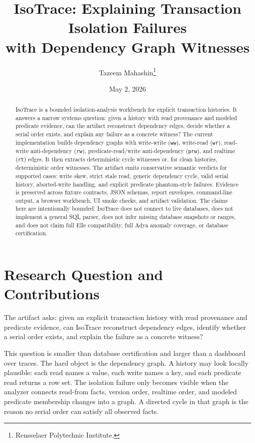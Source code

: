 \documentclass[10pt]{article}
\title{\textbf{IsoTrace: Explaining Transaction Isolation Failures\\with Dependency Graph Witnesses}}
\author{Tazeem Mahashin\footnote{Rensselaer Polytechnic Institute.}}
\date{May 2, 2026}
\newcommand{\code}[1]{\texttt{#1}}
\begin{document}
\maketitle

\begin{abstract}
IsoTrace is a bounded isolation-analysis workbench for explicit transaction histories. It answers a narrow systems question: given a history with read provenance and modeled predicate evidence, can the artifact reconstruct dependency edges, decide whether a serial order exists, and explain any failure as a concrete witness? The current implementation builds dependency graphs with write-write (\code{ww}), write-read (\code{wr}), read-write anti-dependency (\code{rw}), predicate-read/write anti-dependency (\code{prw}), and realtime (\code{rt}) edges. It then extracts deterministic cycle witnesses or, for clean histories, deterministic order witnesses. The artifact emits conservative semantic verdicts for supported cases: write skew, strict stale read, generic dependency cycle, valid serial history, aborted-write handling, and explicit predicate phantom-style failures. Evidence is preserved across fixture contracts, JSON schemas, report envelopes, command-line output, a browser workbench, UI smoke checks, and artifact validation. The claims here are intentionally bounded: IsoTrace does not connect to live databases, does not implement a general SQL parser, does not infer missing database snapshots or ranges, and does not claim full Elle compatibility, full Adya anomaly coverage, or database certification.
\end{abstract}

\section{Research Question and Contributions}

The artifact asks: given an explicit transaction history with read provenance and predicate evidence, can IsoTrace reconstruct dependency edges, identify whether a serial order exists, and explain the failure as a concrete witness?

This question is smaller than database certification and larger than a dashboard over traces. The hard object is the dependency graph. A history may look locally plausible: each read names a value, each write names a key, and each predicate read returns a row set. The isolation failure only becomes visible when the analyzer connects read-from facts, version order, realtime order, and modeled predicate membership changes into a graph. A directed cycle in that graph is the reason no serial order can satisfy all observed facts.
\end{document}
